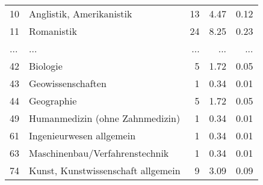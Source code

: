 \begin{longtable}{lXrrr}
        10 & \multicolumn{1}{X}{Anglistik, Amerikanistik} & %
          \num{13} &
          \num[round-mode=places,round-precision=2]{4,47} &
          \num[round-mode=places,round-precision=2]{0,12} \\
        11 & \multicolumn{1}{X}{Romanistik} & %
          \num{24} &
          \num[round-mode=places,round-precision=2]{8,25} &
          \num[round-mode=places,round-precision=2]{0,23} \\
       ... & ... & ... & ... & ... \\
        42 & \multicolumn{1}{X}{Biologie} & %
          \num{5} &
          \num[round-mode=places,round-precision=2]{1,72} &
          \num[round-mode=places,round-precision=2]{0,05} \\

        43 & \multicolumn{1}{X}{Geowissenschaften} & %
          \num{1} &
          \num[round-mode=places,round-precision=2]{0,34} &
          \num[round-mode=places,round-precision=2]{0,01} \\

        44 & \multicolumn{1}{X}{Geographie} & %
          \num{5} &
          \num[round-mode=places,round-precision=2]{1,72} &
          \num[round-mode=places,round-precision=2]{0,05} \\

        49 & \multicolumn{1}{X}{Humanmedizin (ohne Zahnmedizin)} & %
          \num{1} &
          \num[round-mode=places,round-precision=2]{0,34} &
          \num[round-mode=places,round-precision=2]{0,01} \\

        61 & \multicolumn{1}{X}{Ingenieurwesen allgemein} & %
          \num{1} &
          \num[round-mode=places,round-precision=2]{0,34} &
          \num[round-mode=places,round-precision=2]{0,01} \\

        63 & \multicolumn{1}{X}{Maschinenbau/Verfahrenstechnik} & %
          \num{1} &
          \num[round-mode=places,round-precision=2]{0,34} &
          \num[round-mode=places,round-precision=2]{0,01} \\

        74 & \multicolumn{1}{X}{Kunst, Kunstwissenschaft allgemein} & %
          \num{9} &
          \num[round-mode=places,round-precision=2]{3,09} &
          \num[round-mode=places,round-precision=2]{0,09} \\


\end{longtable}
